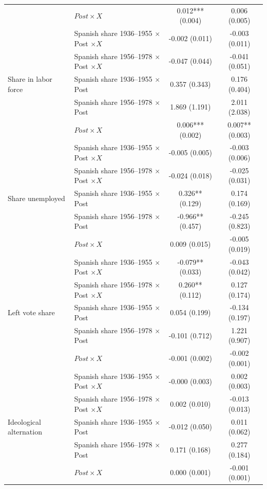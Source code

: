\begin{table}[!htbp]
\begin{tabular}{llcc}
 & \(Post \times X\) & 0.012*** (0.004) & 0.006 (0.005) \\
 & Spanish share 1936--1955 \(\times\) Post \(\times X\) & -0.002 (0.011) & -0.003 (0.011) \\
 & Spanish share 1956--1978 \(\times\) Post \(\times X\) & -0.047 (0.044) & -0.041 (0.051) \\
\addlinespace
Share in labor force & Spanish share 1936--1955 \(\times\) Post & 0.357 (0.343) & 0.176 (0.404) \\
 & Spanish share 1956--1978 \(\times\) Post & 1.869 (1.191) & 2.011 (2.038) \\
 & \(Post \times X\) & 0.006*** (0.002) & 0.007** (0.003) \\
 & Spanish share 1936--1955 \(\times\) Post \(\times X\) & -0.005 (0.005) & -0.003 (0.006) \\
 & Spanish share 1956--1978 \(\times\) Post \(\times X\) & -0.024 (0.018) & -0.025 (0.031) \\
\addlinespace
Share unemployed & Spanish share 1936--1955 \(\times\) Post & 0.326** (0.129) & 0.174 (0.169) \\
 & Spanish share 1956--1978 \(\times\) Post & -0.966** (0.457) & -0.245 (0.823) \\
 & \(Post \times X\) & 0.009 (0.015) & -0.005 (0.019) \\
 & Spanish share 1936--1955 \(\times\) Post \(\times X\) & -0.079** (0.033) & -0.043 (0.042) \\
 & Spanish share 1956--1978 \(\times\) Post \(\times X\) & 0.260** (0.112) & 0.127 (0.174) \\
\addlinespace
Left vote share & Spanish share 1936--1955 \(\times\) Post & 0.054 (0.199) & -0.134 (0.197) \\
 & Spanish share 1956--1978 \(\times\) Post & -0.101 (0.712) & 1.221 (0.907) \\
 & \(Post \times X\) & -0.001 (0.002) & -0.002 (0.001) \\
 & Spanish share 1936--1955 \(\times\) Post \(\times X\) & -0.000 (0.003) & 0.002 (0.003) \\
 & Spanish share 1956--1978 \(\times\) Post \(\times X\) & 0.002 (0.010) & -0.013 (0.013) \\
\addlinespace
Ideological alternation & Spanish share 1936--1955 \(\times\) Post & -0.012 (0.050) & 0.011 (0.062) \\
 & Spanish share 1956--1978 \(\times\) Post & 0.171 (0.168) & 0.277 (0.184) \\
 & \(Post \times X\) & 0.000 (0.001) & -0.001 (0.001) \\

\end{tabular}
\end{table}
